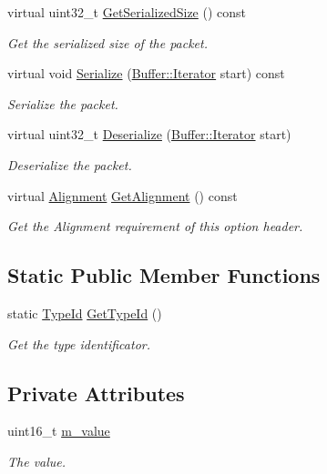 \begin{DoxyCompactItemize}
virtual uint32\+\_\+t \hyperlink{classns3_1_1Ipv6OptionRouterAlertHeader_ab6a69b0fb7d737e3e916535dd44c567e}{Get\+Serialized\+Size} () const 
\begin{DoxyCompactList}\small\item\em Get the serialized size of the packet. \end{DoxyCompactList}\item 
virtual void \hyperlink{classns3_1_1Ipv6OptionRouterAlertHeader_ac65a97a114b0d65bb494cddecb8ac26b}{Serialize} (\hyperlink{classns3_1_1Buffer_1_1Iterator}{Buffer\+::\+Iterator} start) const 
\begin{DoxyCompactList}\small\item\em Serialize the packet. \end{DoxyCompactList}\item 
virtual uint32\+\_\+t \hyperlink{classns3_1_1Ipv6OptionRouterAlertHeader_a41262149c996341e578a7c4afa32ed61}{Deserialize} (\hyperlink{classns3_1_1Buffer_1_1Iterator}{Buffer\+::\+Iterator} start)
\begin{DoxyCompactList}\small\item\em Deserialize the packet. \end{DoxyCompactList}\item 
virtual \hyperlink{structns3_1_1Ipv6OptionHeader_1_1Alignment}{Alignment} \hyperlink{classns3_1_1Ipv6OptionRouterAlertHeader_a772226f1ae24fbb9c0340cf71de5141d}{Get\+Alignment} () const 
\begin{DoxyCompactList}\small\item\em Get the Alignment requirement of this option header. \end{DoxyCompactList}\end{DoxyCompactItemize}
\subsection*{Static Public Member Functions}
\begin{DoxyCompactItemize}
\item 
static \hyperlink{classns3_1_1TypeId}{Type\+Id} \hyperlink{classns3_1_1Ipv6OptionRouterAlertHeader_a95d1fdf9a9fcfc855bad0a1eb6a92a76}{Get\+Type\+Id} ()
\begin{DoxyCompactList}\small\item\em Get the type identificator. \end{DoxyCompactList}\end{DoxyCompactItemize}
\subsection*{Private Attributes}
\begin{DoxyCompactItemize}
\item 
uint16\+\_\+t \hyperlink{classns3_1_1Ipv6OptionRouterAlertHeader_a69b5dedb17e3754989f85ee3b433580d}{m\+\_\+value}
\begin{DoxyCompactList}\small\item\em The value. \end{DoxyCompactList}\end{DoxyCompactItemize}
